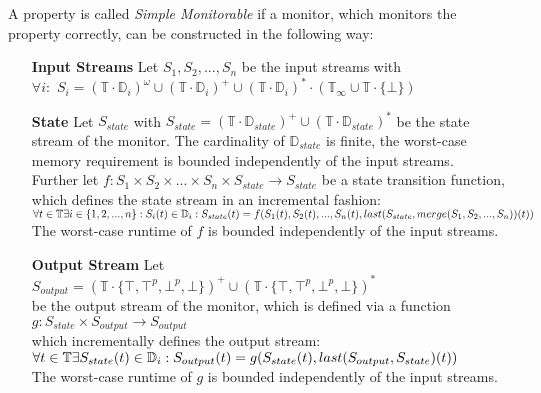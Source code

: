 		\begin{definition}
			A property is called \textit{Simple Monitorable} if a monitor, which monitors the property correctly, can be constructed in the following way:
			\begin{itemize}
				\item[\textbf{Input Streams}]
					Let $S_1, S_2, ..., S_n$ be the input streams with\\
					$\forall i:$ $S_i=(\mathbb{T}\cdot \mathbb{D}_i)^\omega\cup(\mathbb{T}\cdot \mathbb{D}_i)^+\cup(\mathbb{T}\cdot \mathbb{D}_i)^*\cdot(\mathbb{T}_\infty\cup\mathbb{T}\cdot\{\bot\})$
				\item[\textbf{State}]
					Let $S_{state}$ with $S_{state}= (\mathbb{T}\cdot \mathbb{D}_{state})^+\cup(\mathbb{T}\cdot \mathbb{D}_{state})^*$ be the state stream of the monitor. The cardinality of $\mathbb{D}_{state}$ is finite, the worst-case memory requirement is bounded independently of the input streams.\\
					Further let $f: S_1 \times S_2 \times ... \times S_n \times S_{state}\rightarrow S_{state}$ be a state transition function, which defines the state stream in an incremental fashion:\\
					\begin{math}
						\forall t\in \mathbb T \exists i\in \{1,2,...,n\}: S_i(t)\in\mathbb D_i:\\
						S_{state}(t)= f(S_1(t), S_2(t), ..., S_n(t), last(S_{state}, merge(S_1, S_2, ..., S_n))(t))
					\end{math}\\
					The worst-case runtime of $f$ is bounded independently of the input streams.
				\item[\textbf{Output Stream}]
					Let $S_{output}= (\mathbb{T}\cdot \{\top, \top^p, \bot^p, \bot\})^+\cup(\mathbb{T}\cdot \{\top, \top^p, \bot^p, \bot\})^*$\\
					be the output stream of the monitor, which is defined via a function\\
					$g:S_{state}\times S_{output}\rightarrow S_{output}$\\
					which incrementally defines the output stream:\newpage
					\begin{math}
						\forall t\in \mathbb T \exists S_{state}(t)\in\mathbb D_i:\\
						S_{output}(t)= g(S_{state}(t), last(S_{output}, S_{state})(t))
					\end{math}\\
					The worst-case runtime of $g$ is bounded independently of the input streams.
			\end{itemize}
		\end{definition}
